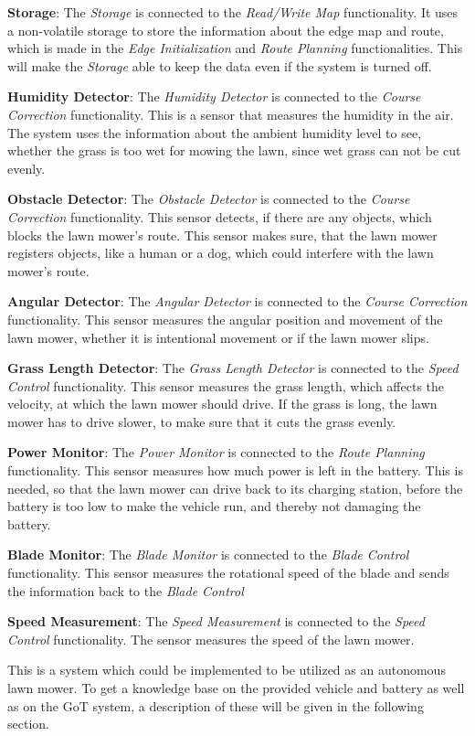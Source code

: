 \textbf{Storage}:
The \textit{Storage} is connected to the \textit{Read/Write Map} functionality. It uses a non-volatile storage to store the information about the edge map and route, which is made in the \textit{Edge Initialization} and \textit{Route Planning} functionalities. This will make the \textit{Storage} able to keep the data even if the system is turned off.

\textbf{Humidity Detector}:
The \textit{Humidity Detector} is connected to the \textit{Course Correction} functionality. This is a sensor that measures the humidity in the air. The system uses the information about the ambient humidity level to see, whether the grass is too wet for mowing the lawn, since wet grass can not be cut evenly. 

\textbf{Obstacle Detector}:
The \textit{Obstacle Detector} is connected to the \textit{Course Correction} functionality. This sensor detects, if there are any objects, which blocks the lawn mower's route. This sensor makes sure, that the lawn mower registers objects, like a human or a dog, which could interfere with the lawn mower's route.

\textbf{Angular Detector}:
The \textit{Angular Detector} is connected to the \textit{Course Correction} functionality. This sensor measures the angular position and movement of the lawn mower, whether it is intentional movement or if the lawn mower slips.

\textbf{Grass Length Detector}:
The \textit{Grass Length Detector} is connected to the \textit{Speed Control} functionality. This sensor measures the grass length, which affects the velocity, at which the lawn mower should drive. If the grass is long, the lawn mower has to drive slower, to make sure that it cuts the grass evenly. 

\textbf{Power Monitor}:
The \textit{Power Monitor} is connected to the \textit{Route Planning} functionality. This sensor measures how much power is left in the battery. This is needed, so that the lawn mower can drive back to its charging station, before the battery is too low to make the vehicle run, and thereby not damaging the battery.

\textbf{Blade Monitor}:
The \textit{Blade Monitor} is connected to the \textit{Blade Control} functionality. This sensor measures the rotational speed of the blade and sends the information back to the \textit{Blade Control}

\textbf{Speed Measurement}:
The \textit{Speed Measurement} is connected to the \textit{Speed Control} functionality. The sensor measures the speed of the lawn mower.

This is a system which could be implemented to be utilized as an autonomous lawn mower. To get a knowledge base on the provided vehicle and battery as well as on the GoT system, a description of these will be given in the following section.